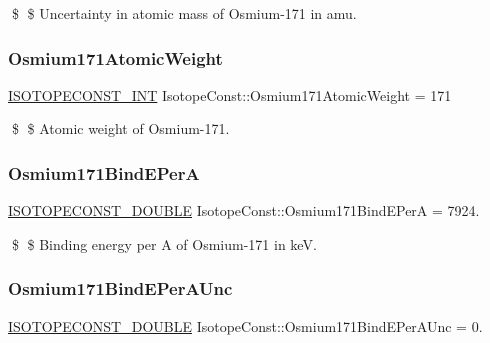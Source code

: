 \$ \$ Uncertainty in atomic mass of Osmium-\/171 in amu. \mbox{\label{group___isotope_const-_osmium-_os171_ga976551a16541a2b59e90f403b3db2a86}} 
\subsubsection{\texorpdfstring{Osmium171\+Atomic\+Weight}{Osmium171AtomicWeight}}
{\footnotesize\ttfamily \mbox{\hyperlink{group___isotope_const-_macros_ga5f18360b3e99483a35c32d789e62621c}{I\+S\+O\+T\+O\+P\+E\+C\+O\+N\+S\+T\+\_\+\+I\+NT}} Isotope\+Const\+::\+Osmium171\+Atomic\+Weight = 171}

\$ \$ Atomic weight of Osmium-\/171. \mbox{\label{group___isotope_const-_osmium-_os171_ga5014e6cf40bbff678337452b56cfa29a}} 
\subsubsection{\texorpdfstring{Osmium171\+Bind\+E\+PerA}{Osmium171BindEPerA}}
{\footnotesize\ttfamily \mbox{\hyperlink{group___isotope_const-_macros_ga8f45a7272ce02c0b4c65c44636ed719a}{I\+S\+O\+T\+O\+P\+E\+C\+O\+N\+S\+T\+\_\+\+D\+O\+U\+B\+LE}} Isotope\+Const\+::\+Osmium171\+Bind\+E\+PerA = 7924.}

\$ \$ Binding energy per A of Osmium-\/171 in keV. \mbox{\label{group___isotope_const-_osmium-_os171_ga0b380da57ed854b79a49a9b14434ad7d}} 
\subsubsection{\texorpdfstring{Osmium171\+Bind\+E\+Per\+A\+Unc}{Osmium171BindEPerAUnc}}
{\footnotesize\ttfamily \mbox{\hyperlink{group___isotope_const-_macros_ga8f45a7272ce02c0b4c65c44636ed719a}{I\+S\+O\+T\+O\+P\+E\+C\+O\+N\+S\+T\+\_\+\+D\+O\+U\+B\+LE}} Isotope\+Const\+::\+Osmium171\+Bind\+E\+Per\+A\+Unc = 0.}

